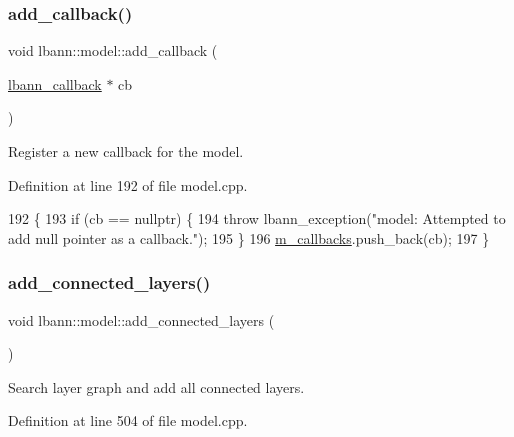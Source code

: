 \subsubsection{\texorpdfstring{add\+\_\+callback()}{add\_callback()}}
{\footnotesize\ttfamily void lbann\+::model\+::add\+\_\+callback (\begin{DoxyParamCaption}\item[{\hyperlink{classlbann_1_1lbann__callback}{lbann\+\_\+callback} $\ast$}]{cb }\end{DoxyParamCaption})}

Register a new callback for the model. 

Definition at line 192 of file model.\+cpp.


\begin{DoxyCode}
192                                            \{
193   \textcolor{keywordflow}{if} (cb == \textcolor{keyword}{nullptr}) \{
194     \textcolor{keywordflow}{throw} lbann\_exception(\textcolor{stringliteral}{"model: Attempted to add null pointer as a callback."});
195   \}
196   \hyperlink{classlbann_1_1model_a07b511fef30368494c2ad80922ffd0eb}{m\_callbacks}.push\_back(cb);
197 \}
\end{DoxyCode}
\mbox{\label{classlbann_1_1model_a3fb0304e6426dd28a436f50559ef2bef}} 
\subsubsection{\texorpdfstring{add\+\_\+connected\+\_\+layers()}{add\_connected\_layers()}}
{\footnotesize\ttfamily void lbann\+::model\+::add\+\_\+connected\+\_\+layers (\begin{DoxyParamCaption}{ }\end{DoxyParamCaption})\hspace{0.3cm}{\ttfamily [private]}}

Search layer graph and add all connected layers. 

Definition at line 504 of file model.\+cpp.


